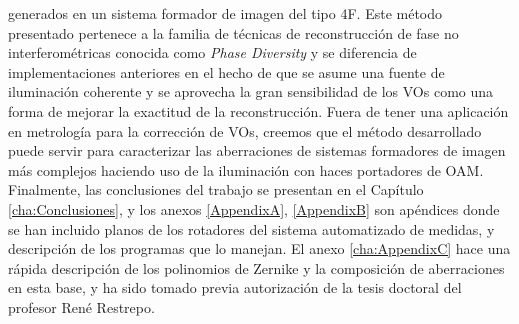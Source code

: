 generados en un sistema formador de imagen del tipo 4F. Este método
presentado pertenece a la familia de técnicas de reconstrucción de
fase no interferométricas conocida como \textit{Phase Diversity} y se
diferencia de implementaciones anteriores en el hecho de que se asume
una fuente de iluminación coherente y se aprovecha la gran
sensibilidad de los VOs como una forma de mejorar la exactitud de la
reconstrucción. 
Fuera de tener una aplicación en metrología para la corrección de VOs,
creemos que el método desarrollado puede servir para caracterizar las
aberraciones de sistemas formadores de imagen más complejos haciendo
uso de la iluminación con haces portadores de OAM. 
Finalmente, las conclusiones del trabajo se presentan en el Capítulo
\ref{cha:Conclusiones}, y los anexos \ref{AppendixA}, \ref{AppendixB}
 son apéndices donde se han incluido planos de los
rotadores del sistema automatizado de medidas, y descripción de los
programas que lo manejan. El anexo \ref{cha:AppendixC} hace una rápida
descripción de los polinomios de Zernike y la composición de
aberraciones en esta base, y ha sido tomado previa autorización de la
tesis doctoral del profesor René Restrepo. 

\newpage
\pagebreak[4]






